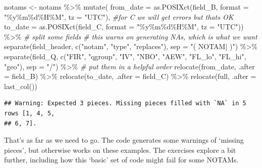 \documentclass[
]{book}
\newenvironment{Shaded}{\begin{snugshade}}{\end{snugshade}}
\newcommand{\AttributeTok}[1]{\textcolor[rgb]{0.77,0.63,0.00}{#1}}
\newcommand{\CommentTok}[1]{\textcolor[rgb]{0.56,0.35,0.01}{\textit{#1}}}
\newcommand{\FunctionTok}[1]{\textcolor[rgb]{0.00,0.00,0.00}{#1}}
\newcommand{\NormalTok}[1]{#1}
\newcommand{\OtherTok}[1]{\textcolor[rgb]{0.56,0.35,0.01}{#1}}
\newcommand{\SpecialCharTok}[1]{\textcolor[rgb]{0.00,0.00,0.00}{#1}}
\newcommand{\StringTok}[1]{\textcolor[rgb]{0.31,0.60,0.02}{#1}}
\begin{document}
\begin{Shaded}
\begin{Highlighting}[]
\NormalTok{notams }\OtherTok{\textless{}{-}}\NormalTok{ notams }\SpecialCharTok{\%\textgreater{}\%} 
  \FunctionTok{mutate}\NormalTok{(}
    \AttributeTok{from\_date =} \FunctionTok{as.POSIXct}\NormalTok{(field\_B, }\AttributeTok{format =} \StringTok{"\%y\%m\%d\%H\%M"}\NormalTok{, }\AttributeTok{tz =} \StringTok{"UTC"}\NormalTok{),}
    \CommentTok{\#for C we will get errors but that\textquotesingle{}s OK}
    \AttributeTok{to\_date =} \FunctionTok{as.POSIXct}\NormalTok{(field\_C, }\AttributeTok{format =} \StringTok{"\%y\%m\%d\%H\%M"}\NormalTok{, }\AttributeTok{tz =} \StringTok{"UTC"}\NormalTok{)) }\SpecialCharTok{\%\textgreater{}\%}
  \CommentTok{\# split some fields}
  \CommentTok{\# this warns on generating NAs, which is what we want}
  \FunctionTok{separate}\NormalTok{(field\_header, }\FunctionTok{c}\NormalTok{(}\StringTok{"notam"}\NormalTok{, }\StringTok{"type"}\NormalTok{, }\StringTok{"replaces"}\NormalTok{), }\AttributeTok{sep =} \StringTok{"( NOTAM| )"}\NormalTok{) }\SpecialCharTok{\%\textgreater{}\%}
  \FunctionTok{separate}\NormalTok{(field\_Q,}
           \FunctionTok{c}\NormalTok{(}\StringTok{"FIR"}\NormalTok{, }\StringTok{"qgroup"}\NormalTok{, }\StringTok{"IV"}\NormalTok{, }\StringTok{"NBO"}\NormalTok{, }\StringTok{"AEW"}\NormalTok{, }\StringTok{"FL\_lo"}\NormalTok{, }\StringTok{"FL\_hi"}\NormalTok{, }\StringTok{"geo"}\NormalTok{),}
           \AttributeTok{sep =} \StringTok{"/"}\NormalTok{) }\SpecialCharTok{\%\textgreater{}\%}
  \CommentTok{\# put them in a helpful order}
  \FunctionTok{relocate}\NormalTok{(from\_date, }\AttributeTok{.after =}\NormalTok{ field\_B) }\SpecialCharTok{\%\textgreater{}\%}
  \FunctionTok{relocate}\NormalTok{(to\_date, }\AttributeTok{.after =}\NormalTok{ field\_C) }\SpecialCharTok{\%\textgreater{}\%}
  \FunctionTok{relocate}\NormalTok{(full, }\AttributeTok{.after =} \FunctionTok{last\_col}\NormalTok{())}
\end{Highlighting}
\end{Shaded}

\begin{verbatim}
## Warning: Expected 3 pieces. Missing pieces filled with `NA` in 5 rows [1, 4, 5,
## 6, 7].
\end{verbatim}

That's as far as we need to go. The code generates some warnings of `missing pieces', but otherwise works on these examples. The exercises explore a bit further, including how this `basic' set of code might fail for some NOTAMs.
\end{document}
